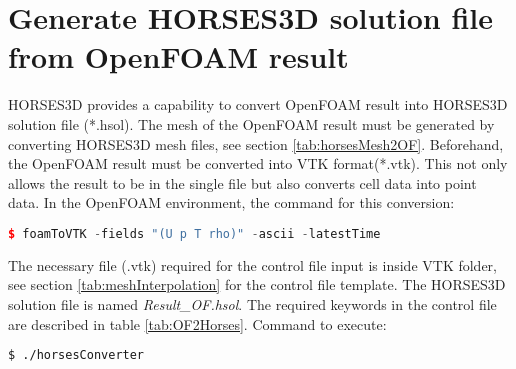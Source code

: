 \documentclass[a4paper,10pt]{report}
\begin{document}
\section{Generate HORSES3D solution file from OpenFOAM result}
HORSES3D provides a capability to convert OpenFOAM result into HORSES3D solution file (*.hsol). The mesh of the OpenFOAM result must be generated by converting HORSES3D mesh files, see section \ref{tab:horsesMesh2OF}. Beforehand, the OpenFOAM result must be converted into VTK format(*.vtk). This not only  allows the result to be in the single file but also converts cell data into point data. In the OpenFOAM environment, the command for this conversion:  
\begin{lstlisting}[language=c++]
	$ foamToVTK -fields "(U p T rho)" -ascii -latestTime
\end{lstlisting}
The necessary file (.vtk) required for the control file input is inside VTK folder, see section \ref{tab:meshInterpolation} for the control file template. The HORSES3D solution file is named \emph{Result\_OF.hsol}. The required keywords in the control file are described in table \ref{tab:OF2Horses}. Command to execute:

\begin{lstlisting}[language=bash]
	$ ./horsesConverter
\end{lstlisting}
\end{document}
